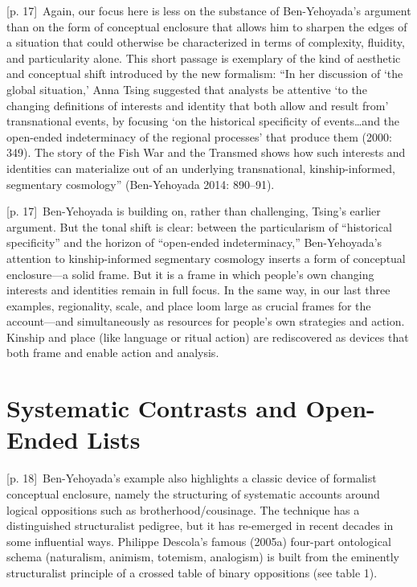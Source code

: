 \documentclass[10pt,a4paper]{article}
\begin{document}
{\scriptsize\color{gray} [p. 17]}\ Again, our focus here is less on the substance of Ben-Yehoyada’s argument than on the form of conceptual enclosure that allows him to sharpen the edges of a situation that could otherwise be characterized in terms of complexity, fluidity, and particularity alone. This short passage is exemplary of the kind of aesthetic and conceptual shift introduced by the new formalism: “In her discussion of ‘the global situation,’ Anna Tsing suggested that analysts be attentive ‘to the changing definitions of interests and identity that both allow and result from’ transnational events, by focusing ‘on the historical specificity of events…and the open-ended indeterminacy of the regional processes’ that produce them (2000: 349). The story of the Fish War and the Transmed shows how such interests and identities can materialize out of an underlying transnational, kinship-informed, segmentary cosmology” (Ben-Yehoyada 2014: 890–91).\par
{\scriptsize\color{gray} [p. 17]}\ Ben-Yehoyada is building on, rather than challenging, Tsing’s earlier argument. But the tonal shift is clear: between the particularism of “historical specificity” and the horizon of “open-ended indeterminacy,” Ben-Yehoyada’s attention to kinship-informed segmentary cosmology inserts a form of conceptual enclosure—a solid frame. But it is a frame in which people’s own changing interests and identities remain in full focus. In the same way, in our last three examples, regionality, scale, and place loom large as crucial frames for the account—and simultaneously as resources for people’s own strategies and action. Kinship and place (like language or ritual action) are rediscovered as devices that both frame and enable action and analysis.\par
{}\section*{Systematic Contrasts and Open-Ended Lists}
{\scriptsize\color{gray} [p. 18]}\ Ben-Yehoyada’s example also highlights a classic device of formalist conceptual enclosure, namely the structuring of systematic accounts around logical oppositions such as brotherhood/cousinage. The technique has a distinguished structuralist pedigree, but it has re-emerged in recent decades in some influential ways. Philippe Descola’s famous (2005a) four-part ontological schema (naturalism, animism, totemism, analogism) is built from the eminently structuralist principle of a crossed table of binary oppositions (see table 1).\par
\end{document}
